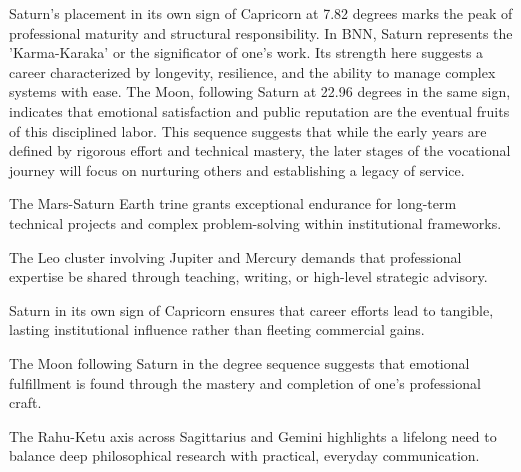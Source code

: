 {\fontsize{9}{13}\selectfont Saturn's placement in its own sign of Capricorn at 7.82 degrees marks the peak of professional maturity and structural responsibility. In BNN, Saturn represents the 'Karma-Karaka' or the significator of one's work. Its strength here suggests a career characterized by longevity, resilience, and the ability to manage complex systems with ease. The Moon, following Saturn at 22.96 degrees in the same sign, indicates that emotional satisfaction and public reputation are the eventual fruits of this disciplined labor. This sequence suggests that while the early years are defined by rigorous effort and technical mastery, the later stages of the vocational journey will focus on nurturing others and establishing a legacy of service.}\par\vspace{1.8mm}

\begin{diamondlist}
  \item {\fontsize{8.5}{12}\selectfont The Mars-Saturn Earth trine grants exceptional endurance for long-term technical projects and complex problem-solving within institutional frameworks.}
  \item {\fontsize{8.5}{12}\selectfont The Leo cluster involving Jupiter and Mercury demands that professional expertise be shared through teaching, writing, or high-level strategic advisory.}
  \item {\fontsize{8.5}{12}\selectfont Saturn in its own sign of Capricorn ensures that career efforts lead to tangible, lasting institutional influence rather than fleeting commercial gains.}
  \item {\fontsize{8.5}{12}\selectfont The Moon following Saturn in the degree sequence suggests that emotional fulfillment is found through the mastery and completion of one's professional craft.}
  \item {\fontsize{8.5}{12}\selectfont The Rahu-Ketu axis across Sagittarius and Gemini highlights a lifelong need to balance deep philosophical research with practical, everyday communication.}
\end{diamondlist}


\label{topic33}

